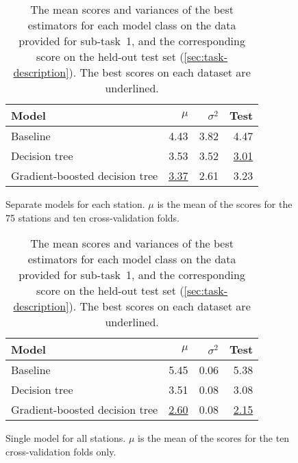 \documentclass[11pt]{extarticle}
\begin{document}
\begin{table}
  \centering
  \begin{subfigure}{\textwidth}
    \centering
    \begin{tabular}{lrrr}
      \toprule
      Model                          & $\mu$            & $\sigma^2$ & Test
      \\
      \midrule
      Baseline                       & 4.43             & 3.82       & 4.47
      \\
      Decision tree                  & 3.53             & 3.52       & \underline{3.01}
      \\
      Gradient-boosted decision tree & \underline{3.37} & 2.61       & 3.23
      \\
      \bottomrule
    \end{tabular}
    \caption{Separate models for each station. $\mu$ is the mean of the scores for the 75 stations
      and ten cross-validation folds.}
    \label{tab:st1:results-1}
  \end{subfigure}
  \subfigurespace
  \begin{subfigure}{\textwidth}
    \centering
    \begin{tabular}{lrrr}
      \toprule
      Model                          & $\mu$            & $\sigma^2$ & Test
      \\
      \midrule
      Baseline                       & 5.45             & 0.06       & 5.38
      \\
      Decision tree                  & 3.51             & 0.08       & 3.08
      \\
      Gradient-boosted decision tree & \underline{2.60} & 0.08       & \underline{2.15}
      \\
      \bottomrule
    \end{tabular}
    \caption{Single model for all stations. $\mu$ is the mean of the scores for the ten
      cross-validation folds only.}
    \label{tab:st1:results-2}
  \end{subfigure}
  \caption{The mean scores and variances of the best estimators for each model
    class on the data provided for sub-task~1, and the corresponding score on the
    held-out test set (\cref{sec:task-description}).
    The best scores on each dataset are underlined.
  }
  \label{tab:st1:results}
\end{table}
\end{document}
